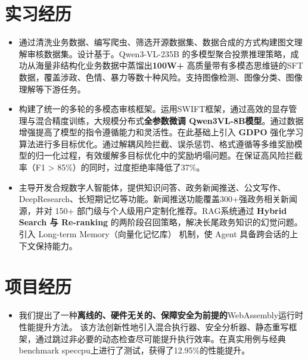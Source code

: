 \documentclass{resume}
\begin{document}
\section{实习经历}
\begin{itemize}
  \item 通过清洗业务数据、编写爬虫、筛选开源数据集、数据合成的方式构建图文理解审核数据集。设计基于。Qwen3-VL-235B 的多模型聚合投票推理策略，成功从海量非结构化业务数据中蒸馏出\textbf{100W+} 高质量带有多模态思维链的SFT 数据，覆盖涉政、色情、暴力等数十种风险。支持图像检测、图像分类、图像理解等下游任务。
  \item 构建了统一的多轮的多模态审核框架。运用SWIFT框架，通过高效的显存管理与混合精度训练，大规模分布式\textbf{全参数微调 Qwen3VL-8B模型}。通过数据增强提高了模型的指令遵循能力和灵活性。在此基础上引入 \textbf{GDPO} 强化学习算法进行多目标优化。通过解耦风险拦截、误杀惩罚、格式遵循等多维奖励模型的归一化过程，有效缓解多目标优化中的奖励坍塌问题。在保证高风险拦截率（F1 > 85\%）的同时，过度拒绝率降低了37\%。
    \item 主导开发合规数字人智能体，提供知识问答、政务新闻推送、公文写作、DeepResearch、长短期记忆等功能。新闻推送功能覆盖300+强政务相关新闻源，并对 150+ 部门级与个人级用户定制化推荐。RAG系统通过 \textbf{Hybrid Search 与 Re-ranking }的两阶段召回策略，解决长尾政务知识的幻觉问题。引入 Long-term Memory（向量化记忆库） 机制，使 Agent 具备跨会话的上下文保持能力。
\end{itemize}
\section{项目经历}
\begin{itemize}
  \item 我们提出了一种\textbf{离线的、硬件无关的、保障安全为前提的}WebAssembly运行时性能提升方法。
该方法创新性地引入混合执行器、安全分析器、静态重写框架，通过跳过非必要的动态检查尽可能提升执行效率。在真实用例与经典benchmark speccpu上进行了测试，获得了12.95\%的性能提升。
\end{itemize}
\end{document}
